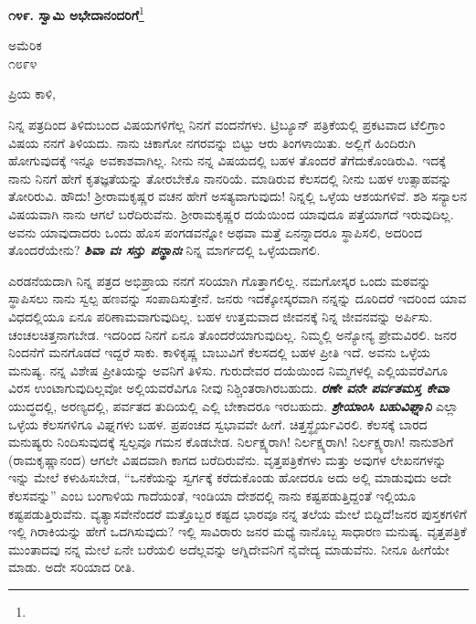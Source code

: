 \begin{center}
\textbf{೧೪೯. ಸ್ವಾಮಿ ಅಭೇದಾನಂದರಿಗೆ}\footnote{}
\end{center}

\begin{flushright}
ಅಮೆರಿಕ\\೧೮೯೪
\end{flushright}

\noindent
ಪ್ರಿಯ ಕಾಳಿ,

ನಿನ್ನ ಪತ್ರದಿಂದ ತಿಳಿದುಬಂದ ವಿಷಯಗಳಿಗೆಲ್ಲ ನಿನಗೆ ವಂದನೆಗಳು. ಟ್ರಿಬ್ಯೂನ್ ಪತ್ರಿಕೆಯಲ್ಲಿ ಪ್ರಕಟವಾದ ಟೆಲಿಗ್ರಾಂ ವಿಷಯ ನನಗೆ ತಿಳಿಯದು. ನಾನು ಚಿಕಾಗೋ ನಗರವನ್ನು ಬಿಟ್ಟು ಆರು ತಿಂಗಳಾಯಿತು. ಅಲ್ಲಿಗೆ ಹಿಂದಿರುಗಿ ಹೋಗುವುದಕ್ಕೆ ಇನ್ನೂ ಅವಕಾಶವಾಗಿಲ್ಲ. ನೀನು ನನ್ನ ವಿಷಯದಲ್ಲಿ ಬಹಳ ತೊಂದರೆ ತೆಗೆದುಕೊಂಡಿರುವಿ. ಇದಕ್ಕೆ ನಾನು ನಿನಗೆ ಹೇಗೆ ಕೃತಜ್ಞತೆಯನ್ನು ತೋರಬೇಕೊ ನಾನರಿಯೆ. ಮಾಡಿರುವ ಕೆಲಸದಲ್ಲಿ ನೀನು ಬಹಳ ಉತ್ಸಾಹವನ್ನು ತೋರಿರುವಿ. ಹೌದು! ಶ‍್ರೀರಾಮಕೃಷ್ಣರ ವಚನ ಹೇಗೆ ಅಸತ್ಯವಾಗುವುದು! ನಿನ್ನಲ್ಲಿ ಒಳ್ಳೆಯ ಆಶಯಗಳಿವೆ. ಶಶಿ ಸನ್ಯಾಲನ ವಿಷಯವಾಗಿ ನಾನು ಆಗಲೆ ಬರೆದಿರುವೆನು. ಶ‍್ರೀರಾಮಕೃಷ್ಣರ ದಯೆಯಿಂದ ಯಾವುದೂ ಪತ್ತೆಯಾಗದೆ ಇರುವುದಿಲ್ಲ. ಅವನು ಯಾವುದಾದರು ಒಂದು ಹೊಸ ಪಂಗಡವನ್ನೋ ಅಥವಾ ಮತ್ತೆ ಏನನ್ನಾದರೂ ಸ್ಥಾಪಿಸಲಿ, ಅದರಿಂದ ತೊಂದರೆಯೇನು? \textbf{\textit{ಶಿವಾ ವಃ ಸನ್ತು ಪನ್ಥಾನಃ}} ನಿನ್ನ ಮಾರ್ಗದಲ್ಲಿ ಒಳ್ಳೆಯದಾಗಲಿ.

ಎರಡನೆಯದಾಗಿ ನಿನ್ನ ಪತ್ರದ ಅಭಿಪ್ರಾಯ ನನಗೆ ಸರಿಯಾಗಿ ಗೊತ್ತಾಗಲಿಲ್ಲ. ನಮಗೋಸ್ಕರ ಒಂದು ಮಠವನ್ನು ಸ್ಥಾಪಿಸಲು ನಾನು ಸ್ವಲ್ಪ ಹಣವನ್ನು ಸಂಪಾದಿಸುತ್ತೇನೆ. ಜನರು ಇದಕ್ಕೋಸ್ಕರವಾಗಿ ನನ್ನನ್ನು ದೂರಿದರೆ ಇದರಿಂದ ಯಾವ ವಿಧದಲ್ಲಿಯೂ ಏನೂ ಪರಿಣಾಮವಾಗುವುದಿಲ್ಲ. ಬಹಳ ಉತ್ತಮವಾದ ಜೀವನಕ್ಕೆ ನಿನ್ನ ಜೀವನವನ್ನು ಅರ್ಪಿಸು. ಚಂಚಲಚಿತ್ತನಾಗಬೇಡ. ಇದರಿಂದ ನಿನಗೆ ಏನೂ ತೊಂದರೆಯಾಗುವುದಿಲ್ಲ. ನಿಮ್ಮಲ್ಲಿ ಅನ್ಯೋನ್ಯ ಪ್ರೇಮವಿರಲಿ. ಜನರ ನಿಂದನೆಗೆ ಮನಗೊಡದೆ ಇದ್ದರೆ ಸಾಕು. ಕಾಳಿಕೃಷ್ಣ ಬಾಬುವಿಗೆ ಕೆಲಸದಲ್ಲಿ ಬಹಳ ಪ್ರೀತಿ ಇದೆ. ಅವನು ಒಳ್ಳೆಯ ಮನುಷ್ಯ. ನನ್ನ ವಿಶೇಷ ಪ್ರೀತಿಯನ್ನು ಅವನಿಗೆ ತಿಳಿಸು. ಗುರುದೇವರ ದಯೆಯಿಂದ ನಿಮ್ಮಗಳಲ್ಲಿ ಎಲ್ಲಿಯವರೆವಿಗೂ ವಿರಸ ಉಂಟಾಗುವುದಿಲ್ಲವೋ ಅಲ್ಲಿಯವರೆವಿಗೂ ನೀವು ನಿಶ್ಚಿಂತರಾಗಿರಬಹುದು. \textbf{\textit{ರಣೇ ವನೇ ಪರ್ವತಮಸ್ತ ಕೇವಾ}} ಯುದ್ಧದಲ್ಲಿ, ಅರಣ್ಯದಲ್ಲಿ, ಪರ್ವತದ ತುದಿಯಲ್ಲಿ ಎಲ್ಲಿ ಬೇಕಾದರೂ ಇರಬಹುದು. \textbf{\textit{ಶ್ರೇಯಾಂಸಿ ಬಹುವಿಘ್ನಾನಿ\enginline{-}}} ಎಲ್ಲಾ ಒಳ್ಳೆಯ ಕೆಲಸಗಳಿಗೂ ವಿಘ್ನಗಳು ಬಹಳ. ಪ್ರಪಂಚದ ಸ್ವಭಾವವೇ ಹೀಗೆ. ಚಿತ್ತಸ್ಥೈರ್ಯವಿರಲಿ. ಕೆಲಸಕ್ಕೆ ಬಾರದ ಮನುಷ್ಯರು ನಿಂದಿಸುವುದಕ್ಕೆ ಸ್ವಲ್ಪವೂ ಗಮನ ಕೊಡಬೇಡ. ನಿರ್ಲಕ್ಷ್ಯರಾಗಿ! ನಿರ್ಲಕ್ಷ್ಯರಾಗಿ! ನಿರ್ಲಕ್ಷ್ಯರಾಗಿ! ನಾನು\enginline{-}ಶಶಿಗೆ (ರಾಮಕೃಷ್ಣಾನಂದ) ಆಗಲೇ ವಿಷದವಾಗಿ ಕಾಗದ ಬರೆದಿರುವೆನು. ವೃತ್ತಪತ್ರಿಕೆಗಳು ಮತ್ತು ಅವುಗಳ ಲೇಖನಗಳನ್ನು ಇನ್ನು ಮೇಲೆ ಕಳುಹಿಸಬೇಡ, “ಒನಕೆಯನ್ನು ಸ್ವರ್ಗಕ್ಕೆ ಕರೆದುಕೊಂಡು ಹೋದರೂ ಅದು ಅಲ್ಲಿ ಮಾಡುವುದು ಅದೇ ಕೆಲಸವನ್ನು” ಎಂಬ ಬಂಗಾಳಿಯ ಗಾದೆಯಂತೆ, ಇಂಡಿಯಾ ದೇಶದಲ್ಲಿ ನಾನು ಕಷ್ಟಪಡುತ್ತಿದ್ದಂತೆ ಇಲ್ಲಿಯೂ ಕಷ್ಟಪಡುತ್ತಿರುವೆನು. ವ್ಯತ್ಯಾಸವೇನೆಂದರೆ ಮತ್ತೊಬ್ಬರ ಕಷ್ಟದ ಭಾರವೂ ನನ್ನ ತಲೆಯ ಮೇಲೆ ಬಿದ್ದಿದೆ!ಜನರ ಪುಸ್ತಕಗಳಿಗೆ ಇಲ್ಲಿ ಗಿರಾಕಿಯನ್ನು ಹೇಗೆ ಒದಗಿಸುವುದು? ಇಲ್ಲಿ ಸಾವಿರಾರು ಜನರ ಮಧ್ಯೆ ನಾನೊಬ್ಬ ಸಾಧಾರಣ ಮನುಷ್ಯ. ವೃತ್ತಪತ್ರಿಕೆ ಮುಂತಾದವು ನನ್ನ ಮೇಲೆ ಏನೇ ಬರೆಯಲಿ ಅದೆಲ್ಲವನ್ನು ಅಗ್ನಿದೇವನಿಗೆ ನೈವೇದ್ಯ ಮಾಡುವೆನು. ನೀನೂ ಹೀಗೆಯೇ ಮಾಡು. ಅದೇ ಸರಿಯಾದ ರೀತಿ.


